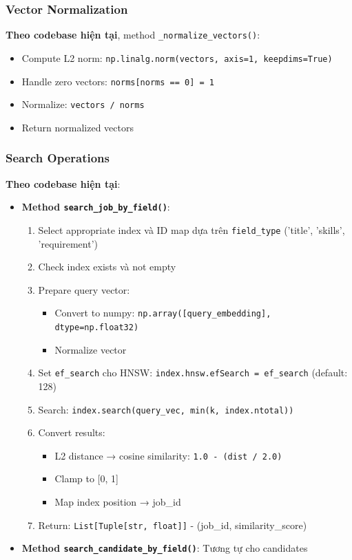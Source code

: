 \subsubsection{Vector Normalization}

\textbf{Theo codebase hiện tại}, method \texttt{\_normalize\_vectors()}:

\begin{itemize}
    \item Compute L2 norm: \texttt{np.linalg.norm(vectors, axis=1, keepdims=True)}
    \item Handle zero vectors: \texttt{norms[norms == 0] = 1}
    \item Normalize: \texttt{vectors / norms}
    \item Return normalized vectors
\end{itemize}

\subsubsection{Search Operations}

\textbf{Theo codebase hiện tại}:

\begin{itemize}
    \item \textbf{Method \texttt{search\_job\_by\_field()}}:
    \begin{enumerate}
        \item Select appropriate index và ID map dựa trên \texttt{field\_type} ('title', 'skills', 'requirement')
        \item Check index exists và not empty
        \item Prepare query vector:
        \begin{itemize}
            \item Convert to numpy: \texttt{np.array([query\_embedding], dtype=np.float32)}
            \item Normalize vector
        \end{itemize}
        \item Set \texttt{ef\_search} cho HNSW: \texttt{index.hnsw.efSearch = ef\_search} (default: 128)
        \item Search: \texttt{index.search(query\_vec, min(k, index.ntotal))}
        \item Convert results:
        \begin{itemize}
            \item L2 distance → cosine similarity: \texttt{1.0 - (dist / 2.0)}
            \item Clamp to [0, 1]
            \item Map index position → job\_id
        \end{itemize}
        \item Return: \texttt{List[Tuple[str, float]]} - (job\_id, similarity\_score)
    \end{enumerate}
    
    \item \textbf{Method \texttt{search\_candidate\_by\_field()}}: Tương tự cho candidates
\end{itemize}


